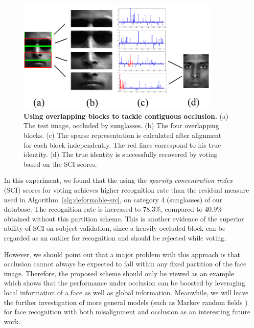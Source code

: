 \documentclass[12pt,journal,draftcls,letterpaper,onecolumn]{IEEEtran}
\providecommand{\DIFaddbeginFL}{} %
\providecommand{\DIFaddendFL}{} %
\providecommand{\DIFdelbeginFL}{} %
\providecommand{\DIFdelendFL}{} %
\begin{document}
\begin{figure}
\centerline{
\includegraphics[width=4in]{figures_pami/occ_block.png}\vspace{-0.2in}}
\caption{{\bf Using overlapping blocks to tackle contiguous occlusion.} (a) The test image, occluded by sunglasses. (b) The four overlapping blocks. (c) The sparse representation is calculated after alignment for each block independently. The red lines correspond to his true identity. (d) The true identity is successfully recovered by voting based on the SCI scores.}
\label{fig:occ-block}
\DIFdelbeginFL %
\DIFdelendFL \DIFaddbeginFL \vspace{-.2in}
\DIFaddendFL \end{figure}

In this experiment, we found that the using the \emph{sparsity
concentration index} (SCI) scores for voting achieves higher
recognition rate than the residual measure used in Algorithm~\ref{alg:deformable-src}, on
category 4 (sunglasses) of our database. The recognition rate
is increased to 78.3\%, compared to 40.9\% obtained without
this partition scheme. This is another evidence of the superior
ability of SCI on subject validation, since a heavily occluded
block can be regarded as an outlier for recognition and should
be rejected while voting.

However, we should point out that a major problem with this
approach is that occlusion cannot always be expected to fall within
 any fixed partition of the face image. Therefore, the
proposed scheme should only be viewed as an example which shows
that the performance under occlusion can be boosted by
leveraging local information of a face as well as global information. Meanwhile, we will
leave the further investigation of more general models (such as Markov
random fields \cite{ZhouZ2009}) for face
recognition with both misalignment and occlusion as an
interesting future work.\vspace{-0.2in}
\end{document}
